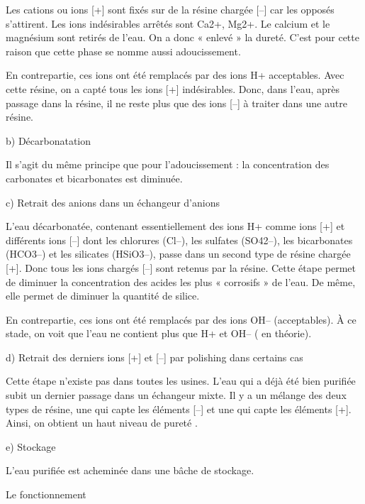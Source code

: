 Les cations ou ions [+] sont fixés sur de la résine chargée [–] car les opposés s’attirent.
Les ions indésirables arrêtés sont Ca2+, Mg2+.
Le calcium et le magnésium sont retirés de l’eau. On a donc « enlevé » la dureté. C’est pour cette raison que cette phase se nomme aussi adoucissement.
\vspace{0.3cm}

En contrepartie, ces ions ont été remplacés par des ions H+ acceptables.
Avec cette résine, on a capté tous les ions [+] indésirables.
Donc, dans l’eau, après passage dans la résine, il ne reste plus que des ions [–] à traiter dans une autre résine.


b) Décarbonatation
\vspace{0.3cm}

Il s’agit du même principe que pour l’adoucissement : la concentration des carbonates et bicarbonates est diminuée.


c) Retrait des anions dans un échangeur d’anions
\vspace{0.3cm}

L’eau décarbonatée, contenant essentiellement des ions H+ comme ions [+] et différents ions [–] dont les chlorures (Cl–), les sulfates (SO42–), les bicarbonates (HCO3–) et les silicates (HSiO3–), passe dans un second type de résine chargée [+].
Donc tous les ions chargés [–] sont retenus par la résine.
Cette étape permet de diminuer la concentration des acides les plus « corrosifs » de l’eau.
De même, elle permet de diminuer la quantité de silice. 

En contrepartie, ces ions ont été remplacés par des ions OH– (acceptables).
À ce stade, on voit que l’eau ne contient plus que H+ et OH– ( en théorie).


d) Retrait des derniers ions [+] et [–] par polishing dans certains cas
\vspace{0.3cm}

Cette étape n’existe pas dans toutes les usines.
L’eau qui a déjà été bien purifiée subit un dernier passage dans un échangeur mixte.
Il y a un mélange des deux types de résine, une qui capte les éléments [–] et une qui capte les éléments [+].
Ainsi, on obtient un haut niveau de pureté .


e) Stockage
\vspace{0.3cm}

L’eau purifiée est acheminée dans une bâche de stockage.


Le fonctionnement
\vspace{0.3cm}


